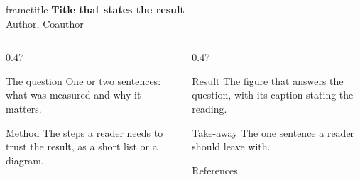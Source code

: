 \documentclass[final]{beamer}
\newcommand{\postertitle}{Title that states the result}
\newcommand{\posterauthors}{Author, Coauthor}
\begin{document}
\begin{frame}[t]
  \begin{beamercolorbox}[wd=\paperwidth,sep=1.5cm]{frametitle}
    {\VeryHuge\bfseries\postertitle}\\[6mm]
    {\LARGE\posterauthors}
  \end{beamercolorbox}

  \vspace{1.5cm}
  \begin{columns}[t,totalwidth=0.94\paperwidth]
    \begin{column}{0.47\paperwidth}
      \begin{block}{The question}
        One or two sentences: what was measured and why it matters.
      \end{block}
      \vspace{1cm}
      \begin{block}{Method}
        The steps a reader needs to trust the result, as a short list or a diagram.
      \end{block}
    \end{column}
    \begin{column}{0.47\paperwidth}
      \begin{block}{Result}
        The figure that answers the question, with its caption stating the reading.
      \end{block}
      \vspace{1cm}
      \begin{alertblock}{Take-away}
        The one sentence a reader should leave with.
      \end{alertblock}
      \vspace{1cm}
      \begin{block}{References}
        \footnotesize\printbibliography[heading=none]
      \end{block}
    \end{column}
  \end{columns}
\end{frame}
\end{document}
